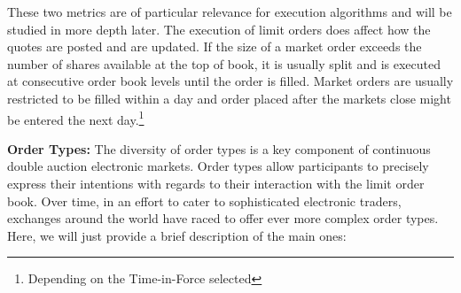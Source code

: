 These two metrics are of particular relevance for execution algorithms and will be studied in more depth later. The execution of limit orders does affect how the quotes are posted and are updated. If the size of a market order exceeds the number of shares available at the top of book, it is usually split and is executed at consecutive order book levels until the order is filled. Market orders are usually restricted to be filled within a day and order placed after the markets close might be entered the next day.\footnote{Depending on the Time-in-Force selected} \twomedskip


\noindent\textbf{Order Types:} The diversity of order types is a key component of continuous double auction electronic markets. Order types allow participants to precisely express their intentions with regards to their interaction with the limit order book. Over time, in an effort to cater to sophisticated electronic traders, exchanges around the world have raced to offer ever more complex order types. Here, we will just provide a brief description of the main ones:

